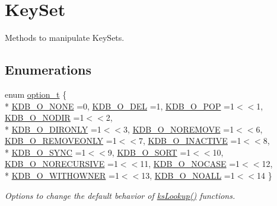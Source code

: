 \hypertarget{group__keyset}{\section{Key\-Set}
\label{group__keyset}
}


Methods to manipulate Key\-Sets.  


\subsection*{Enumerations}
\begin{DoxyCompactItemize}
\item 
enum \hyperlink{group__keyset_ga98a3d6a4016c9dad9cbd1a99a9c2a45a}{option\-\_\-t} \{ \\*
\hyperlink{group__keyset_gga98a3d6a4016c9dad9cbd1a99a9c2a45aa00738455e0ae843c8720809d8287f370}{K\-D\-B\-\_\-\-O\-\_\-\-N\-O\-N\-E} =0, 
\hyperlink{group__keyset_gga98a3d6a4016c9dad9cbd1a99a9c2a45aa66a5380c120f25f28f49848c4a863ead}{K\-D\-B\-\_\-\-O\-\_\-\-D\-E\-L} =1, 
\hyperlink{group__keyset_gga98a3d6a4016c9dad9cbd1a99a9c2a45aa52fb5f2cc86773d393da62bebebf7984}{K\-D\-B\-\_\-\-O\-\_\-\-P\-O\-P} =1$<$$<$1, 
\hyperlink{group__keyset_gga98a3d6a4016c9dad9cbd1a99a9c2a45aa1a70738b2126badb8db7b012c8a1c610}{K\-D\-B\-\_\-\-O\-\_\-\-N\-O\-D\-I\-R} =1$<$$<$2, 
\\*
\hyperlink{group__keyset_gga98a3d6a4016c9dad9cbd1a99a9c2a45aa131e99d60253d0b887a1e5886f8aa96c}{K\-D\-B\-\_\-\-O\-\_\-\-D\-I\-R\-O\-N\-L\-Y} =1$<$$<$3, 
\hyperlink{group__keyset_gga98a3d6a4016c9dad9cbd1a99a9c2a45aa7649f575c2eb0adeaf2c9173ae16e0e6}{K\-D\-B\-\_\-\-O\-\_\-\-N\-O\-R\-E\-M\-O\-V\-E} =1$<$$<$6, 
\hyperlink{group__keyset_gga98a3d6a4016c9dad9cbd1a99a9c2a45aaf6ed09cee8aa8cf0d6a0e318a7105440}{K\-D\-B\-\_\-\-O\-\_\-\-R\-E\-M\-O\-V\-E\-O\-N\-L\-Y} =1$<$$<$7, 
\hyperlink{group__keyset_gga98a3d6a4016c9dad9cbd1a99a9c2a45aa789926d8a8e15b029cf7dded4154bcda}{K\-D\-B\-\_\-\-O\-\_\-\-I\-N\-A\-C\-T\-I\-V\-E} =1$<$$<$8, 
\\*
\hyperlink{group__keyset_gga98a3d6a4016c9dad9cbd1a99a9c2a45aaa7d5265eacbb1590982b718f35443e2e}{K\-D\-B\-\_\-\-O\-\_\-\-S\-Y\-N\-C} =1$<$$<$9, 
\hyperlink{group__keyset_gga98a3d6a4016c9dad9cbd1a99a9c2a45aad9d03b36ee88ca5a774cc01b190c99b8}{K\-D\-B\-\_\-\-O\-\_\-\-S\-O\-R\-T} =1$<$$<$10, 
\hyperlink{group__keyset_gga98a3d6a4016c9dad9cbd1a99a9c2a45aa6adaa17b267027ce50e670bf8cc6e824}{K\-D\-B\-\_\-\-O\-\_\-\-N\-O\-R\-E\-C\-U\-R\-S\-I\-V\-E} =1$<$$<$11, 
\hyperlink{group__keyset_gga98a3d6a4016c9dad9cbd1a99a9c2a45aaa5586d229e048f816bf7982765442b86}{K\-D\-B\-\_\-\-O\-\_\-\-N\-O\-C\-A\-S\-E} =1$<$$<$12, 
\\*
\hyperlink{group__keyset_gga98a3d6a4016c9dad9cbd1a99a9c2a45aab2ff402f5de9aa67b7f786fb715a7a31}{K\-D\-B\-\_\-\-O\-\_\-\-W\-I\-T\-H\-O\-W\-N\-E\-R} =1$<$$<$13, 
\hyperlink{group__keyset_gga98a3d6a4016c9dad9cbd1a99a9c2a45aae8dd1961707e7d0c27228a3f98b0a94d}{K\-D\-B\-\_\-\-O\-\_\-\-N\-O\-A\-L\-L} =1$<$$<$14
 \}
\begin{DoxyCompactList}\small\item\em Options to change the default behavior of \hyperlink{group__keyset_gaa34fc43a081e6b01e4120daa6c112004}{ks\-Lookup()} functions. \end{DoxyCompactList}\end{DoxyCompactItemize}
